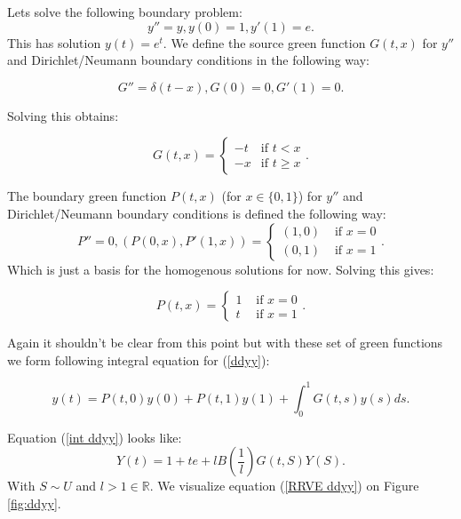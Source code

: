\documentclass[a4paper,12pt]{article}
\begin{document}
\begin{example}[$y''=y$]
    Lets solve the following boundary problem:
    \begin{equation} \label{ddyy}
        y'' = y, y(0) = 1, y'(1)=e.
    \end{equation}
    This has solution $y(t) = e^{t}$. We define the source green function $G(t,x)$
    for $y''$ and Dirichlet/Neumann boundary conditions in the following way:

    \[
        G''= \delta(t-x),G(0)=0,G'(1)=0
        .\]

    Solving this obtains:

    \[
        G(t,x) =
        \begin{cases}
            -t & \text{if } t <  x   \\
            -x & \text{if } t \ge  x
        \end{cases}
        .\]

    The boundary green function $P(t,x)$ (for $x \in \{0,1\}$)
    for $y''$ and Dirichlet/Neumann boundary conditions is defined
    the following way:
    \[
        P'' = 0, \left(P(0,x),P'(1,x) \right)=
        \begin{cases}
            (1 , 0) & \text{ if } x=0 \\
            (0 , 1) & \text{ if } x=1
        \end{cases}
        .\]
    Which is just a basis for the homogenous solutions for now. Solving
    this gives:

    \[
        P(t,x) =
        \begin{cases}
            1 & \text{ if } x=0 \\
            t & \text{ if } x=1
        \end{cases}
        .\]

    Again it shouldn't be clear from this point but with these set of green
    functions we form following integral equation for (\ref{ddyy}):

    \begin{equation} \label{int ddyy}
        y(t) = P(t,0)y(0) + P(t,1)y(1) + \int_{0}^{1}G(t,s) y(s) ds.
    \end{equation}

    Equation (\ref{int ddyy}) looks like:
    \begin{equation} \label{RRVE ddyy}
        Y(t) = 1 + te + l B\left(\frac{1}{l}\right)G(t,S)Y(S).
    \end{equation}
    With $S \sim U$ and $l>1 \in  \mathbb{R}$. We visualize equation (\ref{RRVE ddyy}) on
    Figure \ref{fig:ddyy}.


\end{example}
\end{document}
